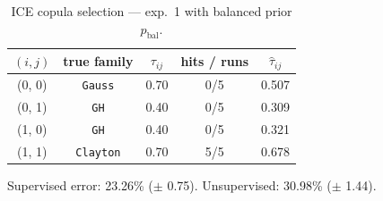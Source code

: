 \begin{table}[htbp]
  \centering
  \caption{ICE copula selection — exp.\ 1 with balanced prior $p_{\text{bal}}$.}
  \label{tab:exp3-exp1_bal_p}
  \begin{tabular}{ccccc}
    \toprule
    $(i, j)$ & true family & $\tau_{ij}$ & hits / runs & $\hat\tau_{ij}$ \\
    \midrule
    (0, 0) & \texttt{Gauss} & 0.70 & 0/5 & 0.507 \\
    (0, 1) & \texttt{GH} & 0.40 & 0/5 & 0.309 \\
    (1, 0) & \texttt{GH} & 0.40 & 0/5 & 0.321 \\
    (1, 1) & \texttt{Clayton} & 0.70 & 5/5 & 0.678 \\
    \bottomrule
  \end{tabular}
  \par\smallskip Supervised error: 23.26\% ($\pm$ 0.75). Unsupervised: 30.98\% ($\pm$ 1.44).
\end{table}
